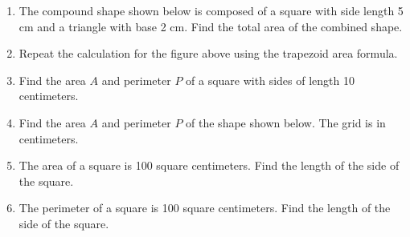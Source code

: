 \begin{enumerate}
\newpage
\item The compound shape shown below is composed of a square with side length 5 cm and a triangle with base 2 cm. Find the total area of the combined shape.
    \vspace{1cm} 
    \begin{flushleft}
    \end{flushleft} \vspace{1cm}
\item Repeat the calculation for the figure above using the trapezoid area formula.

\item Find the area $A$ and perimeter $P$ of a square with sides of length 10 centimeters. \vspace{4cm}
    
  \item Find the area $A$ and perimeter $P$ of the shape shown below. The grid is in centimeters.
      \begin{flushleft}
      \end{flushleft}
        
  \item The area of a square is 100 square centimeters. Find the length of the side of the square. \vspace{3cm}
      
  \item The perimeter of a square is 100 square centimeters. Find the length of the side of the square.
  

\end{enumerate}
